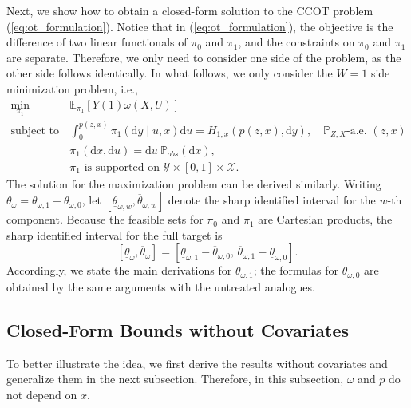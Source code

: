 Next, we show how to obtain a closed-form solution to the CCOT problem (\ref{eq:ot_formulation}).
Notice that in (\ref{eq:ot_formulation}), the objective is the difference of two linear functionals of $\pi_0$ and $\pi_1$, and the constraints on $\pi_0$ and $\pi_1$ are separate. Therefore, we only need to consider one side of the problem, as the other side follows identically. In what follows, we only consider the $W=1$ side minimization problem, i.e., 
\begin{equation}\label{eq:ot_formulation_1}
    \begin{split}
    \min_{ \pi_1}\quad &  \mathbb{E}_{\pi_1}[Y(1)\omega(X,U)]\\
        \text{subject to}  \quad &  \int_0^{p(z,x)} \pi_1(\mathrm{d}y \mid u, x) \mathrm{d}u = H_{1,x}(p(z,x),\mathrm{d}y),\quad \mathbb P_{Z,X}\text{-a.e. }(z,x)\\ 
        & \pi_1(\mathrm{d}x, \mathrm{d}u) = \mathrm{d}u \ \mathbb{P}_{obs}(\mathrm{d}x),\\
        &\pi_1 \text{ is supported on } \mathcal{Y} \times [0,1] \times \mathcal{X}.
    \end{split}
\end{equation} 
The solution for the maximization problem can be derived similarly. Writing $\theta_\omega = \theta_{\omega,1} - \theta_{\omega,0}$, let $[\underline{\theta}_{\omega,w}, \overline{\theta}_{\omega,w}]$ denote the sharp identified interval for the $w$-th component. Because the feasible sets for $\pi_0$ and $\pi_1$ are Cartesian products, the sharp identified interval for the full target is
\[
[\underline{\theta}_\omega, \overline{\theta}_\omega]
=
[\underline{\theta}_{\omega,1} - \overline{\theta}_{\omega,0},\,
\overline{\theta}_{\omega,1} - \underline{\theta}_{\omega,0}].
\]
Accordingly, we state the main derivations for $\theta_{\omega,1}$; the formulas for $\theta_{\omega,0}$ are obtained by the same arguments with the untreated analogues. 
\subsection{Closed-Form Bounds without Covariates}\label{subsec:cf_no_cov}

To better illustrate the idea, we first derive the results without covariates and generalize them in the next subsection. Therefore, in this subsection, $\omega$ and $p$ do not depend on $x$. 

